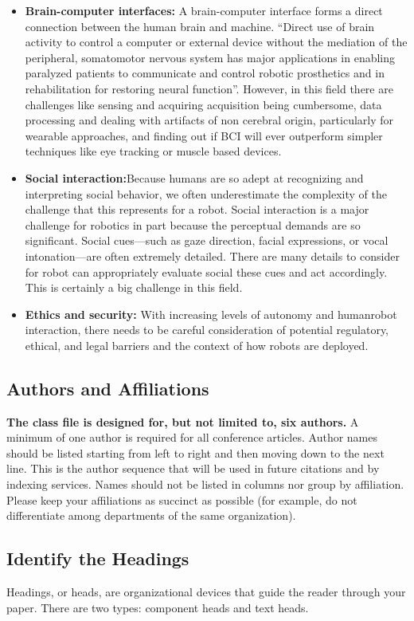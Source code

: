 \documentclass[conference]{IEEEtran}
\begin{document}
\begin{itemize}
\item \textbf{Brain-computer interfaces:} A brain-computer interface forms a direct connection between the human brain and machine. ``Direct use of brain activity to control a computer or external device without the mediation of the peripheral, somatomotor nervous system has major applications in enabling paralyzed patients to communicate and control robotic prosthetics and in rehabilitation for restoring neural function''\autocite{yang2018grand}. However, in this field there are challenges like sensing and acquiring acquisition being cumbersome, data processing and dealing with artifacts of non cerebral origin, particularly for wearable approaches, and finding out if BCI will ever outperform simpler techniques like eye tracking or muscle based devices.
\item \textbf{Social interaction:}Because humans are so adept at recognizing and interpreting social behavior, we often underestimate the complexity of the challenge that this represents for a robot. Social interaction is a major challenge for robotics in part because the perceptual demands are so significant. Social cues—such as gaze direction, facial expressions, or vocal intonation—are often extremely detailed. There are many details to consider for robot can appropriately evaluate social these cues and act accordingly. This is certainly a big challenge in this field.
\item \textbf{Ethics and security:} With increasing levels of autonomy and humanrobot interaction, there needs to be careful consideration of potential regulatory, ethical, and legal barriers and the context of how robots are deployed.
\end{itemize}

\subsection{Authors and Affiliations}
\textbf{The class file is designed for, but not limited to, six authors.} A 
minimum of one author is required for all conference articles. Author names 
should be listed starting from left to right and then moving down to the 
next line. This is the author sequence that will be used in future citations 
and by indexing services. Names should not be listed in columns nor group by 
affiliation. Please keep your affiliations as succinct as possible (for 
example, do not differentiate among departments of the same organization).

\subsection{Identify the Headings}
Headings, or heads, are organizational devices that guide the reader through 
your paper. There are two types: component heads and text heads.
\end{document}

